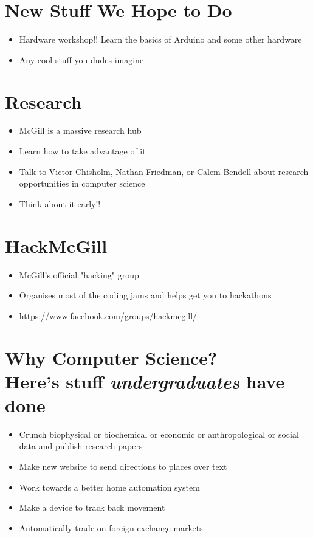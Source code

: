 \clearpage

\section{New Stuff We Hope to Do}

\begin{itemize}
	\item Hardware workshop!!  Learn the basics of Arduino and some other hardware
	\item Any cool stuff you dudes imagine
\end{itemize}

\clearpage

\section{Research}

	\begin{itemize}
		\item McGill is a massive research hub
		\item Learn how to take advantage of it
		\item Talk to Victor Chisholm, Nathan Friedman, or Calem Bendell about research opportunities in computer science
		\item Think about it early!!
	\end{itemize}
	
\clearpage

\section{HackMcGill}

	\begin{itemize}
		\item McGill's official "hacking" group
		\item Organises most of the coding jams and helps get you to hackathons
		\item https://www.facebook.com/groups/hackmcgill/
	\end{itemize}
	
\clearpage

\section{Why Computer Science?  \\ Here's stuff \textit{undergraduates} have done}

	\begin{itemize}
		\item Crunch biophysical or biochemical or economic or anthropological or social data and publish research papers
		\item Make new website to send directions to places over text
		\item Work towards a better home automation system
		\item Make a device to track back movement
		\item Automatically trade on foreign exchange markets
	\end{itemize}
	
	
